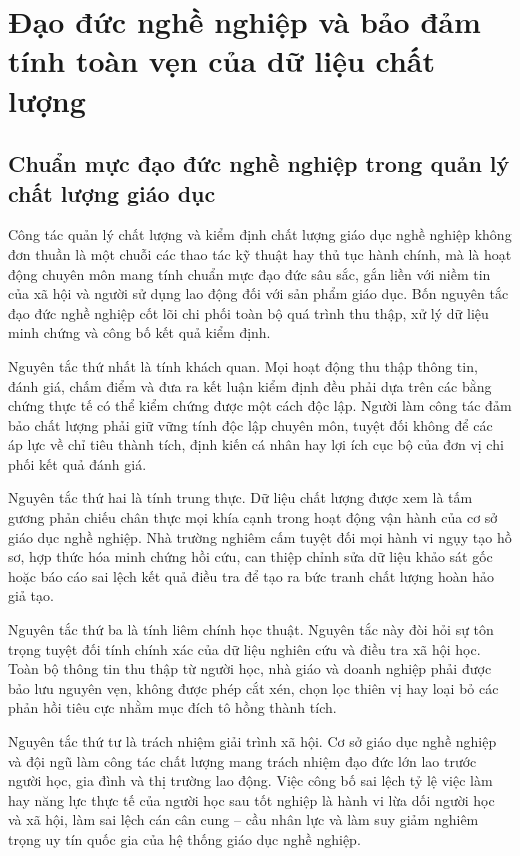 \section{Đạo đức nghề nghiệp và bảo đảm tính toàn vẹn của dữ liệu chất lượng}

\subsection{Chuẩn mực đạo đức nghề nghiệp trong quản lý chất lượng giáo dục}

Công tác quản lý chất lượng và kiểm định chất lượng giáo dục nghề nghiệp không đơn thuần là một chuỗi các thao tác kỹ thuật hay thủ tục hành chính, mà là hoạt động chuyên môn mang tính chuẩn mực đạo đức sâu sắc, gắn liền với niềm tin của xã hội và người sử dụng lao động đối với sản phẩm giáo dục. Bốn nguyên tắc đạo đức nghề nghiệp cốt lõi chi phối toàn bộ quá trình thu thập, xử lý dữ liệu minh chứng và công bố kết quả kiểm định.

Nguyên tắc thứ nhất là tính khách quan. Mọi hoạt động thu thập thông tin, đánh giá, chấm điểm và đưa ra kết luận kiểm định đều phải dựa trên các bằng chứng thực tế có thể kiểm chứng được một cách độc lập. Người làm công tác đảm bảo chất lượng phải giữ vững tính độc lập chuyên môn, tuyệt đối không để các áp lực về chỉ tiêu thành tích, định kiến cá nhân hay lợi ích cục bộ của đơn vị chi phối kết quả đánh giá.

Nguyên tắc thứ hai là tính trung thực. Dữ liệu chất lượng được xem là tấm gương phản chiếu chân thực mọi khía cạnh trong hoạt động vận hành của cơ sở giáo dục nghề nghiệp. Nhà trường nghiêm cấm tuyệt đối mọi hành vi ngụy tạo hồ sơ, hợp thức hóa minh chứng hồi cứu, can thiệp chỉnh sửa dữ liệu khảo sát gốc hoặc báo cáo sai lệch kết quả điều tra để tạo ra bức tranh chất lượng hoàn hảo giả tạo.

Nguyên tắc thứ ba là tính liêm chính học thuật. Nguyên tắc này đòi hỏi sự tôn trọng tuyệt đối tính chính xác của dữ liệu nghiên cứu và điều tra xã hội học. Toàn bộ thông tin thu thập từ người học, nhà giáo và doanh nghiệp phải được bảo lưu nguyên vẹn, không được phép cắt xén, chọn lọc thiên vị hay loại bỏ các phản hồi tiêu cực nhằm mục đích tô hồng thành tích.

Nguyên tắc thứ tư là trách nhiệm giải trình xã hội. Cơ sở giáo dục nghề nghiệp và đội ngũ làm công tác chất lượng mang trách nhiệm đạo đức lớn lao trước người học, gia đình và thị trường lao động. Việc công bố sai lệch tỷ lệ việc làm hay năng lực thực tế của người học sau tốt nghiệp là hành vi lừa dối người học và xã hội, làm sai lệch cán cân cung -- cầu nhân lực và làm suy giảm nghiêm trọng uy tín quốc gia của hệ thống giáo dục nghề nghiệp.

